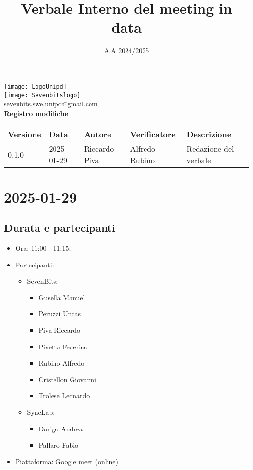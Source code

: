 \documentclass[10pt]{article}
\title{Verbale Interno del meeting in data}
\date{A.A 2024/2025}
\begin{document}
\maketitle
\begin{center}
\texttt{[image: LogoUnipd]}\\
\texttt{[image: Sevenbitslogo]}\\
sevenbits.swe.unipd@gmail.com\\
\vspace{2mm}
\textbf{Registro modifiche}\\
\vspace{2mm}
\begin{tabularx}{\textwidth}{|l|l|l|l|X|}
\hline
\textbf{Versione} & \textbf{Data} & \textbf{Autore} & \textbf{Verificatore} & \textbf{Descrizione} \\
\hline
0.1.0 & 2025-01-29 & Riccardo Piva & Alfredo Rubino & Redazione del verbale \\
\hline
\end{tabularx}
\end{center}
\newpage
\tableofcontents
\newpage
\section{2025-01-29}
\subsection{Durata e partecipanti}
\begin{itemize}
\item Ora: 11:00 - 11:15;
\item Partecipanti: 	
	\begin{itemize}
	\item 	SevenBits:
			\begin{itemize}
				\item Gusella Manuel
				\item Peruzzi Uncas
				\item Piva Riccardo
				\item Pivetta Federico
				\item Rubino Alfredo
				\item Cristellon Giovanni
				\item Trolese Leonardo
			\end{itemize}
	\item 	SyncLab:
			\begin{itemize}
				\item Dorigo Andrea
				\item Pallaro Fabio
			\end{itemize}
	\end{itemize}
\item Piattaforma: Google meet (online)
\end{itemize}
\end{document}
